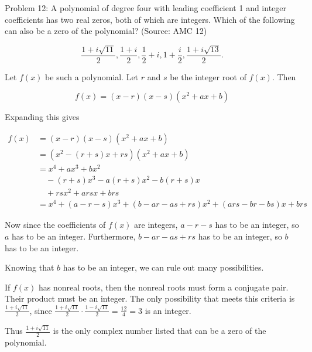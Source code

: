 Problem 12: A polynomial of degree four with leading coefficient 1 and integer coefficients has two real zeros, both of which are integers. Which of the following can also be a zero of the polynomial? (Source: AMC 12)

$$ \frac{1 + i \sqrt{11}}{2}, \frac{1 + i}{2}, \frac{1}{2} + i, 1 + \frac{i}{2}, \frac{1 + i \sqrt{13}}{2}. $$

Let $f(x)$ be such a polynomial. Let $r$ and $s$ be the integer root of $f(x)$. Then

$$ f(x) = (x - r)(x - s)(x^2 + ax + b) $$

Expanding this gives

\begin{align*}
f(x) &= (x - r)(x - s)(x^2 + ax + b) \\
&= (x^2 - (r + s)x + rs)(x^2 + ax + b) \\
&= x^4 + ax^3 + bx^2 \\
& \quad - (r + s)x^3 - a(r + s)x^2 - b(r + s)x \\
& \quad + rsx^2 + arsx + brs \\
&= x^4 + (a - r - s)x^3 + (b - ar - as + rs)x^2 + (ars - br - bs)x + brs
\end{align*}

Now since the coefficients of $f(x)$ are integers, $a - r - s$ has to be an integer, so $a$ has to be an integer. Furthermore, $b - ar - as + rs$ has to be an integer, so $b$ has to be an integer.

Knowing that $b$ has to be an integer, we can rule out many possibilities. 

If $f(x)$ has nonreal roots, then the nonreal roots must form a conjugate pair. Their product must be an integer. The only possibility that meets this criteria is $\displaystyle \frac{1 + i \sqrt{11}}{2}$, since $\displaystyle \frac{1 + i \sqrt{11}}{2} \cdot \frac{1 - i \sqrt{11}}{2} = \frac{12}{4} = 3$ is an integer.

Thus $\boxed{\displaystyle \frac{1 + i \sqrt{11}}{2}}$ is the only complex number listed that can be a zero of the polynomial.

